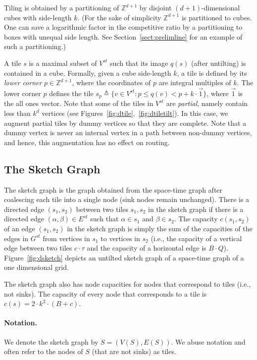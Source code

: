 \documentclass[11pt]{article}
\newcommand{\eqdf}{\triangleq}
\newenvironment{proof sketch}[1]{\noindent {\emph{Proof sketch of #1:}}}{\hfill \qed}
\newcommand{\hl}{\tau}
\newcommand{\vl}{Q}
\begin{document}
Tiling is obtained by a partitioning of $\mathbb{Z}^{d+1}$ by disjoint
$(d+1)$-dimensional cubes with side-length $k$.  (For the sake of simplicity
$\mathbb{Z}^{d+1}$ is partitioned to cubes. One can save a logarithmic factor in the
competitive ratio by a partitioning to boxes with unequal side
length. See Section~\ref{sect:prelimline} for an example of such a partitioning.)


A tile $s$ is a maximal subset of $V^{st}$ such that its image $q(s)$ (after untilting) is contained in a cube.
Formally, given a cube side-length $k$, a tile is defined by its \emph{lower corner}
$p\in \mathbb{Z}^{d+1}$, where the coordinates of $p$ are integral multiples of $k$.
The lower corner $p$ defines the tile $s_p \eqdf \{v\in V^{st} : p \leq q(v) <
p+k\cdot \vec{1}\}$, where $\vec{1}$ is the all ones vector. Note that some of the
tiles in $V^{st}$ are \emph{partial}, namely contain less than $k^d$ vertices (see
Figures~\ref{fig:dtile},~\ref{fig:dtiletilt}). In this case, we augment partial tiles
by dummy vertices so that they are complete.
Note that a dummy vertex is never an internal vertex in a path between non-dummy
vertices, and hence, this augmentation has no effect on routing.
\subsection{The Sketch Graph}\label{sect:sketchgraph}
The sketch graph is the graph obtained from the space-time graph after coalescing
each tile into a single node (sink nodes remain unchanged).  There is a directed edge
$(s_1,s_2)$ between two tiles $s_1,s_2$ in the sketch graph if there is a directed
edge $(\alpha,\beta)\in E^{st}$ such that $\alpha\in s_1$ and $\beta\in s_2$. The
capacity $c(s_1,s_2)$ of an edge $(s_1,s_2)$ in the sketch graph is simply the sum of
the capacities of the edges in $G^{st}$ from vertices in $s_1$ to vertices in $s_2$
(i.e., the capacity of a vertical edge between two tiles $c\cdot \hl$ and the capacity of a
horizontal edge is $B\cdot \vl$).  Figure~\ref{fig:dsketch} depicts an untilted sketch graph
of a space-time graph of a one dimensional grid.

The sketch graph also has node capacities for nodes that correspond to tiles (i.e.,
not sinks). The capacity of every node that corresponds to a tile is $c(s)=2\cdot
k^2\cdot (B+c)$.
\paragraph{Notation.}
We denote the sketch graph by $S=(V(S),E(S))$.
We abuse notation and often refer to the nodes of $S$ (that are not sinks) as tiles.
\end{document}
